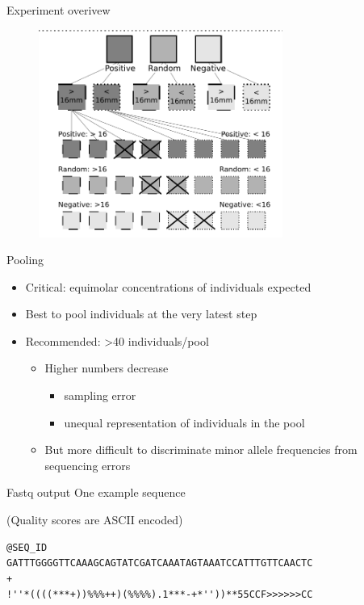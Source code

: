 \documentclass[presentation]{beamer}
\begin{document}
\begin{frame}[label=sec-2]{Experiment overivew}
\begin{figure}[htb]
\centering
\includegraphics[width=8cm]{ExperimentalOverview.png}
\end{figure}
\end{frame}
\begin{frame}[label=sec-3]{Pooling}
\begin{itemize}
\item Critical: equimolar concentrations of individuals expected
\item Best to pool individuals at the very latest step
\item Recommended: >40 individuals/pool
\begin{itemize}
\item Higher numbers decrease 
\begin{itemize}
\item sampling error
\item unequal representation of individuals in the pool
\end{itemize}
\item But more difficult to discriminate minor allele
frequencies from sequencing errors
\end{itemize}
\end{itemize}
\end{frame}

\begin{frame}[fragile,label=sec-4]{Fastq output}
 One example sequence

(Quality scores are ASCII encoded)

\begin{verbatim}
@SEQ_ID
GATTTGGGGTTCAAAGCAGTATCGATCAAATAGTAAATCCATTTGTTCAACTC
+
!''*((((***+))%%%++)(%%%%).1***-+*''))**55CCF>>>>>>CC
\end{verbatim}
\end{frame}
\end{document}

